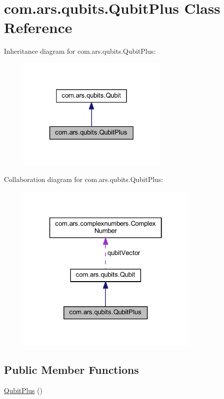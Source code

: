 \hypertarget{classcom_1_1ars_1_1qubits_1_1_qubit_plus}{}\section{com.\+ars.\+qubits.\+Qubit\+Plus Class Reference}
\label{classcom_1_1ars_1_1qubits_1_1_qubit_plus}


Inheritance diagram for com.\+ars.\+qubits.\+Qubit\+Plus\+:\nopagebreak
\begin{figure}[H]
\begin{center}
\leavevmode
\includegraphics[width=207pt]{classcom_1_1ars_1_1qubits_1_1_qubit_plus__inherit__graph}
\end{center}
\end{figure}


Collaboration diagram for com.\+ars.\+qubits.\+Qubit\+Plus\+:\nopagebreak
\begin{figure}[H]
\begin{center}
\leavevmode
\includegraphics[width=250pt]{classcom_1_1ars_1_1qubits_1_1_qubit_plus__coll__graph}
\end{center}
\end{figure}
\subsection*{Public Member Functions}
\begin{DoxyCompactItemize}
\item 
\hyperlink{classcom_1_1ars_1_1qubits_1_1_qubit_plus_a094f90aed7126ad716207496299e08dc}{Qubit\+Plus} ()
\end{DoxyCompactItemize}
